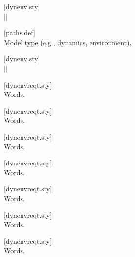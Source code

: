 \begin{description}
\item[] \hfill [dynenv.sty] \\
  |{\MODELTITLE\xspace}|
\item[] \hfill [paths.def] \\
  Model type (e.g., dynamics, environment).
\item[] \hfill [dynenv.sty] \\
  |{\MODELTYPE\xspace}|
\item[]
  \hfill [dynenvreqt.sty] \\
  Words.
\item[] \hfill [dynenvreqt.sty] \\
  Words.
\item[] \hfill [dynenvreqt.sty] \\
  Words.
\item[] \hfill [dynenvreqt.sty] \\
  Words.
\item[]
  \hfill [dynenvreqt.sty] \\
  Words.
\item[]
  \hfill [dynenvreqt.sty] \\
  Words.
\item[]
  \hfill [dynenvreqt.sty] \\
  Words.
\end{description}

